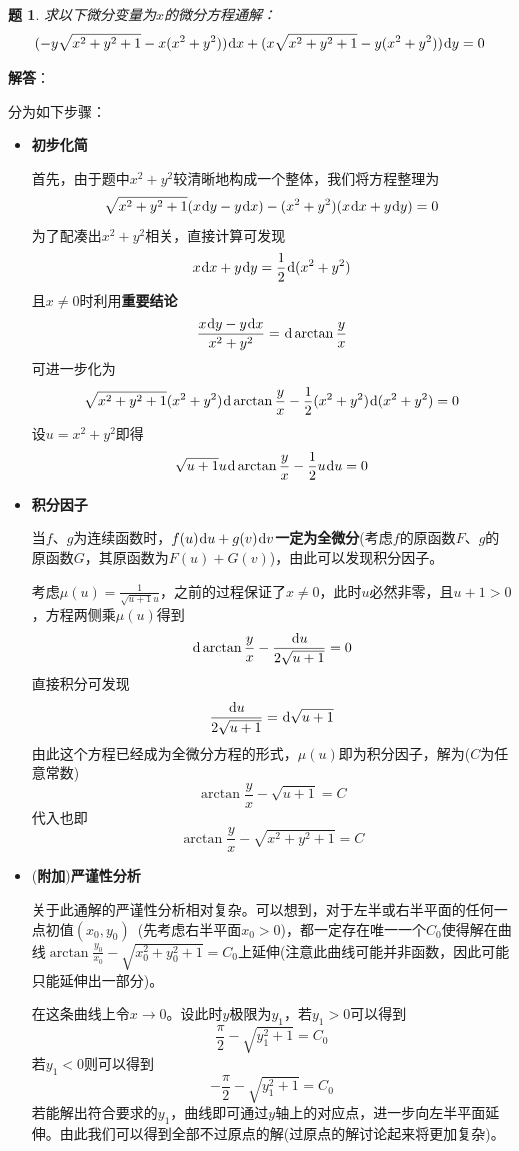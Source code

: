 \documentclass[a4paper,UTF8,fontset=windows,AutoFakeBold]{ctexart}
\newcommand*{\dr}{\hspace{0.07em}\mathrm{d}}
\newcommand*{\extra}{\textbf{附加}}
\newcommand*{\note}{\noindent *}
\theoremstyle{ex}
\newtheorem{exercise}{题}
\newcommand{\sol}[1]{{\vspace{5pt}\kaishu\noindent\textbf{解答}：\vspace{-3pt}
\begin{compactitem}
    \item[] #1
\end{compactitem}
}}
\begin{document}
\begin{framed}
\begin{exercise}\label{find factor}
    求以下微分变量为$x$的微分方程通解：
    $$(-y\sqrt{x^2+y^2+1}-x(x^2+y^2))\dr x+(x\sqrt{x^2+y^2+1}-y(x^2+y^2))\dr y=0$$
\end{exercise}
\sol{
    分为如下步骤：
    \begin{itemize}
        \item \textbf{初步化简}
        
        首先，由于题中$x^2+y^2$较清晰地构成一个整体，我们将方程整理为
        $$\sqrt{x^2+y^2+1}(x\dr y-y\dr x)-(x^2+y^2)(x\dr x+y\dr y)=0$$
        为了配凑出$x^2+y^2$相关，直接计算可发现
        $$x\dr x+y\dr y=\frac{1}{2}\dr(x^2+y^2)$$
        且$x\ne0$时利用\textbf{重要结论}
        $$\frac{x\dr y-y\dr x}{x^2+y^2}=\dr\arctan\frac{y}{x}$$
        可进一步化为
        $$\sqrt{x^2+y^2+1}(x^2+y^2)\dr\arctan\frac{y}{x}-\frac{1}{2}(x^2+y^2)\dr(x^2+y^2)=0$$
        设$u=x^2+y^2$即得
        $$\sqrt{u+1}u\dr\arctan\frac{y}{x}-\frac{1}{2}u\dr u=0$$
        
        \item \textbf{积分因子}
        
        \note 当$f$、$g$为连续函数时，$f(u)\dr u+g(v)\dr v$\textbf{一定为全微分}(考虑$f$的原函数$F$、$g$的原函数$G$，其原函数为$F(u)+G(v)$)，由此可以发现积分因子。

        考虑$\mu(u)=\frac{1}{\sqrt{u+1}u}$，之前的过程保证了$x\ne0$，此时$u$必然非零，且$u+1>0$，方程两侧乘$\mu(u)$得到
        $$\dr\arctan\frac{y}{x}-\frac{\dr u}{2\sqrt{u+1}}=0$$
        直接积分可发现
        $$\frac{\dr u}{2\sqrt{u+1}}=\dr\sqrt{u+1}$$
        由此这个方程已经成为全微分方程的形式，$\mu(u)$即为积分因子，解为($C$为任意常数)
        $$\arctan\frac{y}{x}-\sqrt{u+1}=C$$
        代入也即
        $$\arctan\frac{y}{x}-\sqrt{x^2+y^2+1}=C$$ 

        \item (\extra)\textbf{严谨性分析}
        
        关于此通解的严谨性分析相对复杂。可以想到，对于左半或右半平面的任何一点初值$(x_0,y_0)$\ (先考虑右半平面$x_0>0$)，都一定存在唯一一个$C_0$使得解在曲线$\arctan\frac{y_0}{x_0}-\sqrt{x_0^2+y_0^2+1}=C_0$上延伸(注意此曲线可能并非函数，因此可能只能延伸出一部分)。

        在这条曲线上令$x\to0$。设此时$y$极限为$y_1$，若$y_1>0$可以得到
        $$\frac{\pi}{2}-\sqrt{y_1^2+1}=C_0$$
        若$y_1<0$则可以得到
        $$-\frac{\pi}{2}-\sqrt{y_1^2+1}=C_0$$
        若能解出符合要求的$y_1$，曲线即可通过$y$轴上的对应点，进一步向左半平面延伸。由此我们可以得到全部不过原点的解(过原点的解讨论起来将更加复杂)。
    \end{itemize}
}
\end{framed}
\end{document}
